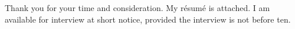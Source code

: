 
Thank you for your time and consideration. My r\'esum\'e is attached. I am available for interview at short notice, provided the interview is not before ten.
